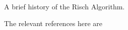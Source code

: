 A brief history of the Risch Algorithm.

The relevant references here are~\cite{moses1971symbolic,risch1969problem}